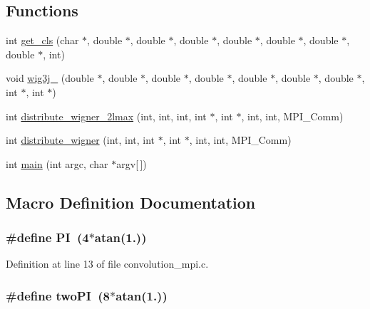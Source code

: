 \subsection*{Functions}
\begin{DoxyCompactItemize}
\item 
int \hyperlink{convolution__mpi_8c_acd0142ec39047291acf248c48b0a28f4}{get\-\_\-cls} (char $\ast$, double $\ast$, double $\ast$, double $\ast$, double $\ast$, double $\ast$, double $\ast$, double $\ast$, int)
\item 
void \hyperlink{convolution__mpi_8c_af06278380393e21ff3f1bf4db83834b4}{wig3j\-\_\-} (double $\ast$, double $\ast$, double $\ast$, double $\ast$, double $\ast$, double $\ast$, double $\ast$, int $\ast$, int $\ast$)
\item 
int \hyperlink{convolution__mpi_8c_a89f27ccc4509d2e1e33dd4ce95f9db0c}{distribute\-\_\-wigner\-\_\-2lmax} (int, int, int, int $\ast$, int $\ast$, int, int, M\-P\-I\-\_\-\-Comm)
\item 
int \hyperlink{convolution__mpi_8c_aea159557fbdfdb49fa220df8dab8b425}{distribute\-\_\-wigner} (int, int, int $\ast$, int $\ast$, int, int, M\-P\-I\-\_\-\-Comm)
\item 
int \hyperlink{convolution__mpi_8c_a0ddf1224851353fc92bfbff6f499fa97}{main} (int argc, char $\ast$argv\mbox{[}$\,$\mbox{]})
\end{DoxyCompactItemize}


\subsection{Macro Definition Documentation}
\subsubsection[{P\-I}]{\setlength{\rightskip}{0pt plus 5cm}\#define P\-I~(4$\ast$atan(1.))}\label{convolution__mpi_8c_a598a3330b3c21701223ee0ca14316eca}


Definition at line 13 of file convolution\-\_\-mpi.\-c.

\subsubsection[{two\-P\-I}]{\setlength{\rightskip}{0pt plus 5cm}\#define two\-P\-I~(8$\ast$atan(1.))}\label{convolution__mpi_8c_a0a3527f8b23535fe43972fbe88c3cc0d}


